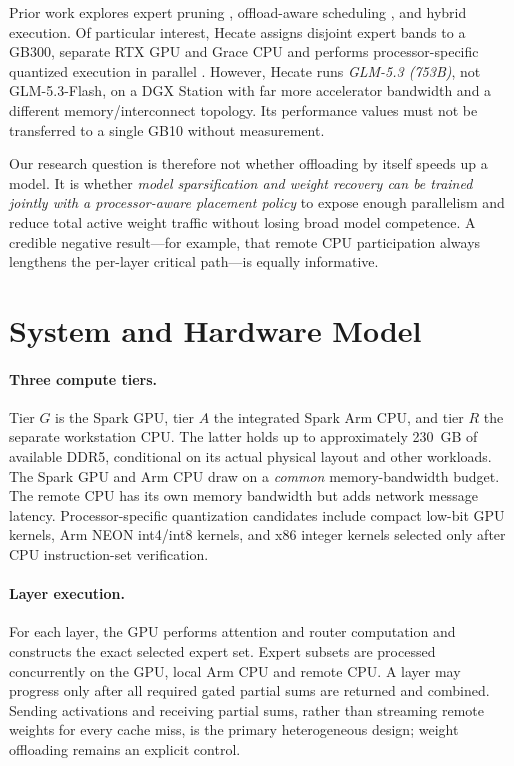 \documentclass[10pt,twocolumn]{article}
\begin{document}
Prior work explores expert pruning \cite{reap,hope}, offload-aware scheduling \cite{prescope,hetroute,spice}, and hybrid execution. Of particular interest, Hecate assigns disjoint expert bands to a GB300, separate RTX GPU and Grace CPU and performs processor-specific quantized execution in parallel \cite{hecate}. However, Hecate runs \emph{GLM-5.3 (753B)}, not GLM-5.3-Flash, on a DGX Station with far more accelerator bandwidth and a different memory/interconnect topology. Its performance values must not be transferred to a single GB10 without measurement.

Our research question is therefore not whether offloading by itself speeds up a model. It is whether \emph{model sparsification and weight recovery can be trained jointly with a processor-aware placement policy} to expose enough parallelism and reduce total active weight traffic without losing broad model competence. A credible negative result---for example, that remote CPU participation always lengthens the per-layer critical path---is equally informative.

\section{System and Hardware Model}
\paragraph{Three compute tiers.} Tier $G$ is the Spark GPU, tier $A$ the integrated Spark Arm CPU, and tier $R$ the separate workstation CPU. The latter holds up to approximately 230~GB of available DDR5, conditional on its actual physical layout and other workloads. The Spark GPU and Arm CPU draw on a \emph{common} memory-bandwidth budget. The remote CPU has its own memory bandwidth but adds network message latency. Processor-specific quantization candidates include compact low-bit GPU kernels, Arm NEON int4/int8 kernels, and x86 integer kernels selected only after CPU instruction-set verification.

\paragraph{Layer execution.} For each layer, the GPU performs attention and router computation and constructs the exact selected expert set. Expert subsets are processed concurrently on the GPU, local Arm CPU and remote CPU. A layer may progress only after all required gated partial sums are returned and combined. Sending activations and receiving partial sums, rather than streaming remote weights for every cache miss, is the primary heterogeneous design; weight offloading remains an explicit control.
\end{document}
